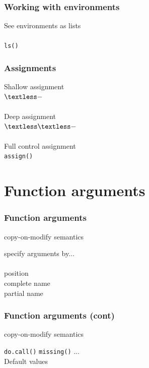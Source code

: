 \documentclass{beamer}
\begin{document}
\begin{frame}
	\frametitle{Working with environments}
	\begin{center}	
		See environments as lists \\~\\
		\texttt{ls()}
	\end{center}
\end{frame}

\begin{frame}
	\frametitle{Assignments}
	\begin{center}
		Shallow assignment \\
		$\textless-$ \\~\\
		Deep assignment \\
		$\textless\textless-$ \\~\\
		Full control assignment \\
		\texttt{assign()} \\
	\end{center}
\end{frame}

\section{Function arguments}

\begin{frame}
	\frametitle{Function arguments}
	\centerline{copy-on-modify semantics}
	\begin{center}
		specify arguments by... \\~\\
		position \\
		complete name \\
		partial name \\
	\end{center}
\end{frame}


\begin{frame}
	\frametitle{Function arguments (cont)}
	\centerline{copy-on-modify semantics}
	\begin{center}
		\texttt{do.call()}
		\texttt{missing()}
		... \\
		Default values \\
	\end{center}
\end{frame}
\end{document}
